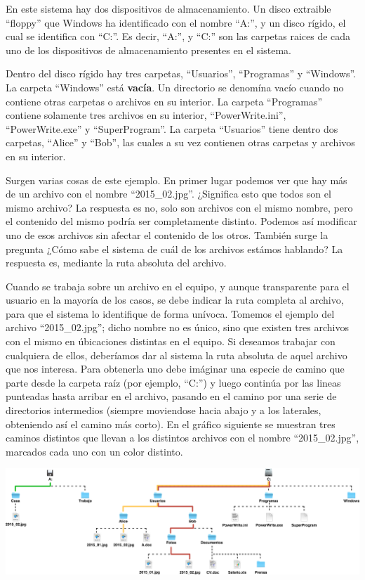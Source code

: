 En este sistema hay dos dispositivos de almacenamiento. Un disco extraible ``floppy''
que Windows ha identificado con el nombre ``A:'', y un disco rígido, el cual se
identifica con ``C:''. Es decir, ``A:'', y ``C:'' son las carpetas raices de cada
uno de los dispositivos de almacenamiento presentes en el sistema.

Dentro del disco rígido hay tres carpetas, ``Usuarios'', ``Programas'' y ``Windows''.
La carpeta ``Windows'' está \textbf{vacía}. Un directorio se denomína vacío
cuando no contiene otras carpetas o archivos en su interior. La carpeta
``Programas'' contiene solamente tres archivos en su interior, ``PowerWrite.ini'',
``PowerWrite.exe'' y ``SuperProgram''. La carpeta ``Usuarios'' tiene dentro
dos carpetas, ``Alice'' y ``Bob'', las cuales a su vez contienen otras carpetas
y archivos en su interior.

Surgen varias cosas de este ejemplo. En primer lugar podemos ver que hay más de
un archivo con el nombre ``2015\_02.jpg''. ¿Significa esto que todos son el mismo
archivo? La respuesta es no, solo son archivos con el mismo nombre, pero el
contenido del mismo podría ser completamente distinto. Podemos así modificar uno
de esos archivos sin afectar el contenido de los otros. También surge la
pregunta ¿Cómo sabe el sistema de cuál de los archivos estámos hablando? La
respuesta es, mediante la ruta absoluta del archivo.

Cuando se trabaja sobre un archivo en el equipo, y aunque transparente para el
usuario en la mayoría de los casos, se debe indicar la ruta completa al archivo,
para que el sistema lo identifique de forma unívoca. Tomemos el ejemplo del archivo
``2015\_02.jpg''; dicho nombre no es único, sino que existen tres archivos con
el mismo en úbicaciones distintas en el equipo. Si deseamos trabajar con cualquiera
de ellos, deberíamos dar al sistema la ruta absoluta de aquel archivo que nos
interesa. Para obtenerla uno debe imáginar una especie de camino que parte desde la
carpeta raíz (por ejemplo, ``C:'') y luego continúa por las lineas punteadas hasta
arribar en el archivo, pasando en el camino por una serie de directorios intermedios
(siempre moviendose hacia abajo y a los laterales, obteniendo así el camino más corto).
En el gráfico siguiente se muestran tres caminos distintos que llevan a los distintos
archivos con el nombre ``2015\_02.jpg'', marcados cada uno con un color distinto.

\vspace{0.5cm}
\centerline{\includegraphics[scale=0.35]{capitulos/informatica/imagenes/directorios_windows_2.png}}

